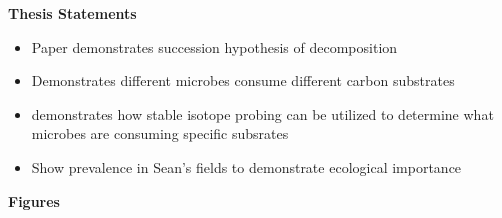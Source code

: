 \textbf{Thesis Statements}
\begin{itemize}
\item Paper demonstrates succession hypothesis of decomposition
\item Demonstrates different microbes consume different carbon substrates
\item demonstrates how stable isotope probing can be utilized to determine what microbes are consuming specific subsrates
\item Show prevalence in Sean's fields to demonstrate ecological importance
\end{itemize}


\textbf{Figures}


